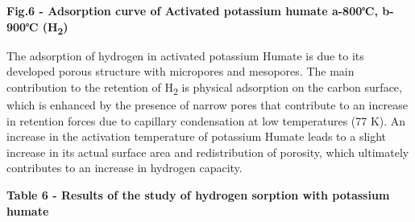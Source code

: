 
{\bfseries Fig.6 - Adsorption curve of Activated potassium humate a-800℃,
b-900℃ (H\textsubscript{2})}

The adsorption of hydrogen in activated potassium Humate is due to its
developed porous structure with micropores and mesopores. The main
contribution to the retention of H\textsubscript{2} is physical
adsorption on the carbon surface, which is enhanced by the presence of
narrow pores that contribute to an increase in retention forces due to
capillary condensation at low temperatures (77 K). An increase in the
activation temperature of potassium Humate leads to a slight increase in
its actual surface area and redistribution of porosity, which ultimately
contributes to an increase in hydrogen capacity.

{\bfseries Table 6 - Results of the study of hydrogen sorption with
potassium humate}


